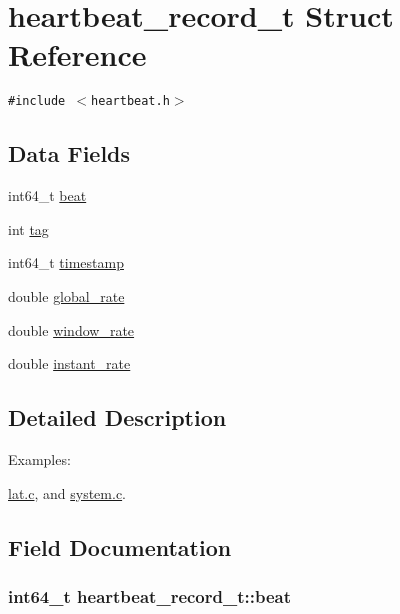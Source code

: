 \hypertarget{structheartbeat__record__t}{
\section{heartbeat\_\-record\_\-t Struct Reference}
\label{structheartbeat__record__t}
}
{\tt \#include $<$heartbeat.h$>$}

\subsection*{Data Fields}
\begin{CompactItemize}
\item 
int64\_\-t \hyperlink{structheartbeat__record__t_0e578caa371b6378cf9815b606f4409e}{beat}
\item 
int \hyperlink{structheartbeat__record__t_77ac9f7644a849d9d33905b94bca72be}{tag}
\item 
int64\_\-t \hyperlink{structheartbeat__record__t_744972ad7d10b9a0a134ca6e64ea9b2e}{timestamp}
\item 
double \hyperlink{structheartbeat__record__t_fafc174b226737430192fa3b29a9b869}{global\_\-rate}
\item 
double \hyperlink{structheartbeat__record__t_52413f5573d4c7212f5b312f8932d05a}{window\_\-rate}
\item 
double \hyperlink{structheartbeat__record__t_8b6c1c4cd6ef723694e3aadad0cf4e6e}{instant\_\-rate}
\end{CompactItemize}


\subsection{Detailed Description}
\begin{Desc}
\item[Examples: ]\par


\hyperlink{lat_8c-example}{lat.c}, and \hyperlink{system_8c-example}{system.c}.\end{Desc}


\subsection{Field Documentation}
\hypertarget{structheartbeat__record__t_0e578caa371b6378cf9815b606f4409e}{
\subsubsection[beat]{\setlength{\rightskip}{0pt plus 5cm}int64\_\-t {\bf heartbeat\_\-record\_\-t::beat}}}
\label{structheartbeat__record__t_0e578caa371b6378cf9815b606f4409e}



